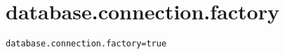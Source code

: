 \section{database.connection.factory}
\label{configuration:DatabaseConnectionFactory}
\ClearAPI
\TODO
{}
\begin{lstlisting}[style=Props,caption={Usage example for \textit{database.connection.factory}}]
database.connection.factory=true
\end{lstlisting}